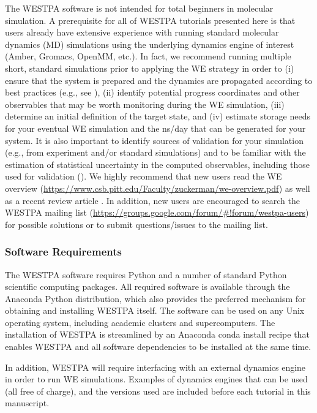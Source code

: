 \documentclass[9pt,tutorial,pubversion]{livecoms}
\begin{document}
The WESTPA software is not intended for total beginners in molecular simulation. 
A prerequisite for all of WESTPA tutorials presented here is that users already have extensive experience with running standard molecular dynamics (MD) simulations using the underlying dynamics engine of interest (Amber, Gromacs, OpenMM, etc.). 
In fact, we recommend running multiple short, standard simulations prior to applying the WE strategy in order to (i) ensure that the system is prepared and the dynamics are propagated according to best practices (e.g., see \citep{Mobley2019}), (ii) identify potential progress coordinates and other observables that may be worth monitoring during the WE simulation, (iii) determine an initial definition of the target state, and (iv) estimate storage needs for your eventual WE simulation and the ns/day that can be generated for your system. 
It is also important to identify sources of validation for your simulation (e.g., from experiment and/or standard simulations) and to be familiar with the estimation of statistical uncertainty in the computed observables, including those used for validation (\citep{Grossfield2019}). 
We highly recommend that new users read the WE overview (\url{https://www.csb.pitt.edu/Faculty/zuckerman/we-overview.pdf}) as well as a recent review article \citep{ZuckermanChong2017}. 
In addition, new users are encouraged to search the WESTPA mailing list (\url{https://groups.google.com/forum/#!forum/westpa-users}) for possible solutions or to submit questions/issues to the mailing list.

\subsubsection{Software Requirements}

The WESTPA software requires Python and a number of standard Python scientific computing packages. 
All required software is available through the Anaconda Python distribution, which also provides the preferred mechanism for obtaining and installing WESTPA itself. 
The software can be used on any Unix operating system, including academic clusters and supercomputers. 
The installation of WESTPA is streamlined by an Anaconda conda install recipe that enables WESTPA and all software dependencies to be installed at the same time.

In addition, WESTPA will require interfacing with an external dynamics engine in order to run WE simulations.  Examples of dynamics engines that can be used (all free of charge), and the versions used are included before each tutorial in this manuscript.
\end{document}

